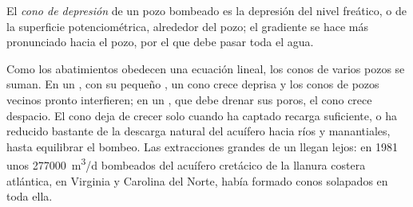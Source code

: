\begin{definition}\label{def:b3:hydrogeology:cone}
El \emph{cono de depresión} de un pozo bombeado es
la depresión del nivel freático, o de la superficie potenciométrica,
alrededor del pozo; el gradiente se hace más pronunciado hacia el pozo, por el que
debe pasar toda el agua.
\end{definition}

Como los abatimientos obedecen una ecuación lineal, los conos de varios pozos
se suman. En un , con su pequeño , un cono crece deprisa
y los conos de pozos vecinos pronto interfieren; en un , que debe drenar sus poros, el cono crece despacio. El cono deja de
crecer solo cuando ha captado recarga suficiente, o ha reducido bastante de
la descarga natural del acuífero hacia ríos y manantiales, hasta equilibrar el
bombeo. Las extracciones grandes de un  llegan lejos: en 1981
unos \qty{277000}{m^3/d} bombeados del acuífero cretácico de la
llanura costera atlántica, en Virginia y Carolina del Norte, había formado
conos solapados en toda ella.

